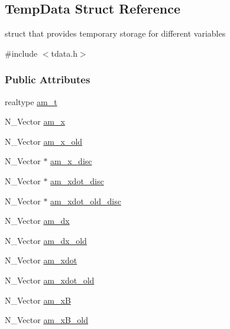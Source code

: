 \hypertarget{struct_temp_data}{}\subsection{Temp\+Data Struct Reference}
\label{struct_temp_data}


struct that provides temporary storage for different variables  




{\ttfamily \#include $<$tdata.\+h$>$}

\subsubsection*{Public Attributes}
\begin{DoxyCompactItemize}
\item 
realtype \hyperlink{struct_temp_data_ae0484650df254ad9cd8883e2ba028892}{am\+\_\+t}
\item 
N\+\_\+\+Vector \hyperlink{struct_temp_data_a4527d9abde45ba3982c35d2c12969d36}{am\+\_\+x}
\item 
N\+\_\+\+Vector \hyperlink{struct_temp_data_ab2b23f4045b47a4a73226543e77f9dcc}{am\+\_\+x\+\_\+old}
\item 
N\+\_\+\+Vector $\ast$ \hyperlink{struct_temp_data_aded6511f60d9b0cdfe5f4df047d8a5dd}{am\+\_\+x\+\_\+disc}
\item 
N\+\_\+\+Vector $\ast$ \hyperlink{struct_temp_data_ab3837be5f66a858b04b2e6fbae66a100}{am\+\_\+xdot\+\_\+disc}
\item 
N\+\_\+\+Vector $\ast$ \hyperlink{struct_temp_data_aae23888e89a7bd3c65a22784acaa1328}{am\+\_\+xdot\+\_\+old\+\_\+disc}
\item 
N\+\_\+\+Vector \hyperlink{struct_temp_data_ac10ec733609d33c557d48c1cc4c9f6f1}{am\+\_\+dx}
\item 
N\+\_\+\+Vector \hyperlink{struct_temp_data_aca2465f16eeb5dc94cea61c970f2682a}{am\+\_\+dx\+\_\+old}
\item 
N\+\_\+\+Vector \hyperlink{struct_temp_data_abad4a9e3cc9cd42b3fe4e2fe28a915c1}{am\+\_\+xdot}
\item 
N\+\_\+\+Vector \hyperlink{struct_temp_data_a6a8af565a7f6ec58c4fbcd044c049d80}{am\+\_\+xdot\+\_\+old}
\item 
N\+\_\+\+Vector \hyperlink{struct_temp_data_a318f0b9b1f4b33326184a350912c6fb1}{am\+\_\+x\+B}
\item 
N\+\_\+\+Vector \hyperlink{struct_temp_data_a33e09af3351a4d4889e62d0d0d964ce5}{am\+\_\+x\+B\+\_\+old}
\item 

\end{DoxyCompactItemize}
